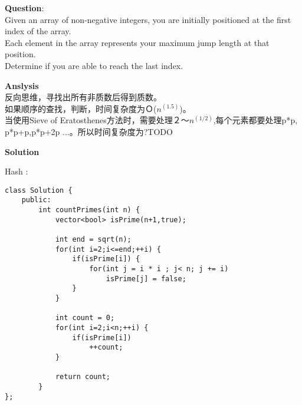     
\begin{description}
    \item{\textbf{Question}}:\\%
	Given an array of non-negative integers, you are initially positioned at the first index of the array.\\
	Each element in the array represents your maximum jump length at that position.\\
	Determine if you are able to reach the last index.\\

    \item{\textbf{Anslysis}}\\
		反向思维，寻找出所有非质数后得到质数。\\
		如果顺序的查找，判断，时间复杂度为Ｏ($n^(1.5)$)。\\
		当使用Sieve of Eratosthenes方法时，需要处理２～$n^(1/2)$,每个元素都要处理p*p, p*p+p,p*p+2p ...。所以时间复杂度为?TODO\\

    \item{\textbf{Solution}}\\
	\item{Hash} : \\
		\begin{lstlisting}
class Solution {
	public:
		int countPrimes(int n) {
			vector<bool> isPrime(n+1,true);

			int end = sqrt(n);
			for(int i=2;i<=end;++i) {
				if(isPrime[i]) {
					for(int j = i * i ; j< n; j += i) 
						isPrime[j] = false;
				}
			}

			int count = 0;
			for(int i=2;i<n;++i) {
				if(isPrime[i])
					++count;
			}

			return count;
		}
};
		\end{lstlisting}

\end{description}

